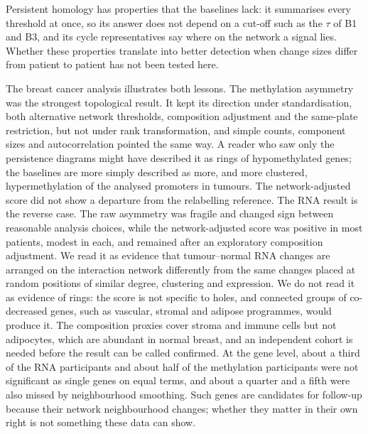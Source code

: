 Persistent homology has properties that the baselines lack: it summarises every threshold at once, so its answer does not depend on a cut-off such as the $\tau$ of B1 and B3, and its cycle representatives say where on the network a signal lies. Whether these properties translate into better detection when change sizes differ from patient to patient has not been tested here.

The breast cancer analysis illustrates both lessons. The methylation asymmetry was the strongest topological result. It kept its direction under standardisation, both alternative network thresholds, composition adjustment and the same-plate restriction, but not under rank transformation, and simple counts, component sizes and autocorrelation pointed the same way. A reader who saw only the persistence diagrams might have described it as rings of hypomethylated genes; the baselines are more simply described as more, and more clustered, hypermethylation of the analysed promoters in tumours. The network-adjusted score did not show a departure from the relabelling reference. The RNA result is the reverse case. The raw asymmetry was fragile and changed sign between reasonable analysis choices, while the network-adjusted score was positive in most patients, modest in each, and remained after an exploratory composition adjustment. We read it as evidence that tumour--normal RNA changes are arranged on the interaction network differently from the same changes placed at random positions of similar degree, clustering and expression. We do not read it as evidence of rings: the score is not specific to holes, and connected groups of co-decreased genes, such as vascular, stromal and adipose programmes, would produce it. The composition proxies cover stroma and immune cells but not adipocytes, which are abundant in normal breast, and an independent cohort is needed before the result can be called confirmed. At the gene level, about a third of the RNA participants and about half of the methylation participants were not significant as single genes on equal terms, and about a quarter and a fifth were also missed by neighbourhood smoothing. Such genes are candidates for follow-up because their network neighbourhood changes; whether they matter in their own right is not something these data can show.
